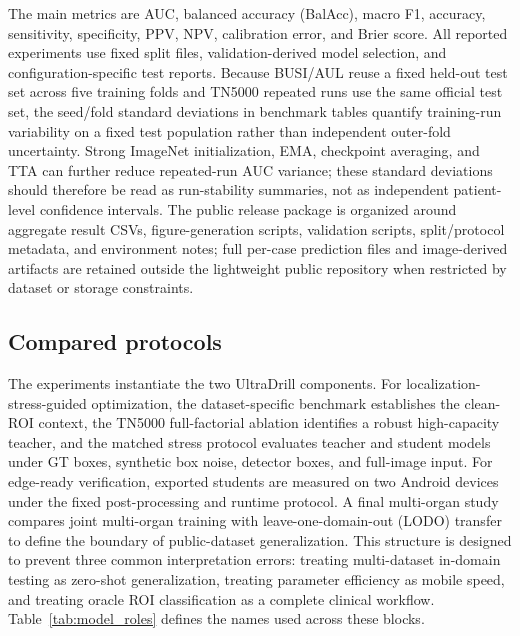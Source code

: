 \documentclass[preprint,12pt]{elsarticle}
\begin{document}
The main metrics are AUC, balanced accuracy (BalAcc), macro F1, accuracy, sensitivity, specificity, PPV, NPV, calibration error, and Brier score. All reported experiments use fixed split files, validation-derived model selection, and configuration-specific test reports. Because BUSI/AUL reuse a fixed held-out test set across five training folds and TN5000 repeated runs use the same official test set, the seed/fold standard deviations in benchmark tables quantify training-run variability on a fixed test population rather than independent outer-fold uncertainty. Strong ImageNet initialization, EMA, checkpoint averaging, and TTA can further reduce repeated-run AUC variance; these standard deviations should therefore be read as run-stability summaries, not as independent patient-level confidence intervals. The public release package is organized around aggregate result CSVs, figure-generation scripts, validation scripts, split/protocol metadata, and environment notes; full per-case prediction files and image-derived artifacts are retained outside the lightweight public repository when restricted by dataset or storage constraints.

\subsection{Compared protocols}

The experiments instantiate the two UltraDrill components. For localization-stress-guided optimization, the dataset-specific benchmark establishes the clean-ROI context, the TN5000 full-factorial ablation identifies a robust high-capacity teacher, and the matched stress protocol evaluates teacher and student models under GT boxes, synthetic box noise, detector boxes, and full-image input. For edge-ready verification, exported students are measured on two Android devices under the fixed post-processing and runtime protocol. A final multi-organ study compares joint multi-organ training with leave-one-domain-out (LODO) transfer to define the boundary of public-dataset generalization. This structure is designed to prevent three common interpretation errors: treating multi-dataset in-domain testing as zero-shot generalization, treating parameter efficiency as mobile speed, and treating oracle ROI classification as a complete clinical workflow. Table~\ref{tab:model_roles} defines the names used across these blocks.
\end{document}
